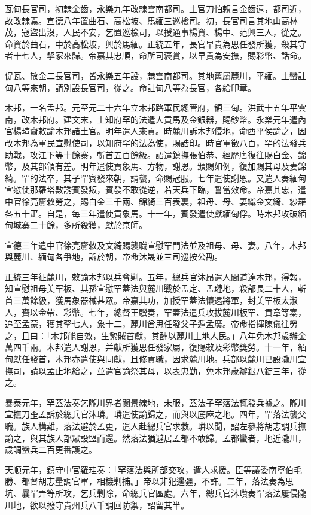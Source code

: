 \begin{pinyinscope}
瓦甸長官司，初隸金齒，永樂九年改隸雲南都司。土官刀怕賴言金齒遠，都司近，故改隸焉。宣德八年置曲石、高松坡、馬緬三巡檢司。初，長官司言其地山高林茂，寇盜出沒，人民不安，乞置巡檢司，以授通事楊資、楊中、范興三人，從之。命資於曲石，中於高松坡，興於馬緬。正統五年，長官早貴為思任發所獲，殺其守者十七人，挈家來歸。帝嘉其忠順，命所司褒賞，以早貴為安撫，賜彩幣、誥命。

促瓦、散金二長官司，皆永樂五年設，隸雲南都司。其地舊屬麓川，平緬。土蠻註甸八等來朝，請別設長官司，從之。命註甸八等為長官，各給印章。

木邦，一名孟邦。元至元二十六年立木邦路軍民總管府，領三甸。洪武十五年平雲南，改木邦府。建文末，土知府罕的法遣人貢馬及金銀器，賜鈔幣。永樂元年遣內官楊瑄齎敕諭木邦諸土官。明年遣人來貢。時麓川訴木邦侵地，命西平侯諭之，因改木邦為軍民宣慰使司，以知府罕的法為使，賜誥印。時官軍徵八百，罕的法發兵助戰，攻江下等十餘寨，斬首五百餘級。詔遣鎮撫張伯恭、經歷唐復往賜白金、錦幣，及其部領有差。明年遣使貢象馬、方物，謝恩。頒賜如例，復加賜其母及妻錦綺。罕的法卒，其子罕賓發來朝，請襲，命賜冠服。七年遣使謝恩。又遣人奏緬甸宣慰使那羅塔數誘賓發叛，賓發不敢從逆，若天兵下臨，誓當效命。帝嘉其忠，遣中官徐亮齎敕勞之，賜白金三千兩、錦綺三百表裏，祖母、母、妻織金文綺、紗羅各五十疋。自是，每三年遣使貢象馬。十一年，賓發遣使獻緬甸俘。時木邦攻破緬甸城寨二十餘，多所殺獲，獻於京師。

宣德三年遣中官徐亮齎敕及文綺賜襲職宣慰罕門法並及祖母、母、妻。八年，木邦與麓川、緬甸各爭地，訴於朝，帝命沐晟並三司巡按公勘。

正統三年征麓川，敕諭木邦以兵會剿。五年，總兵官沐昂遣人間道達木邦，得報，知宣慰祖母美罕板、其孫宣慰罕蓋法與麓川戰於孟定、孟璉地，殺部長二十人，斬首三萬餘級，獲馬象器械甚眾。帝嘉其功，加授罕蓋法懷遠將軍，封美罕板太淑人，賚以金帶、彩幣。七年，總督王驥奏，罕蓋法遣兵攻拔麓川板罕、貢章等寨，追至孟蒙，獲其孥七人，象十二，麓川酋思任發父子遁孟廣。帝命指揮陳儀往勞之，且曰：「木邦能自效，生縶賊首獻，其酬以麓川土地人民。」八年免木邦歲辦金萬四千兩。木邦遣人謝恩，并獻所獲思任發家屬，復賜敕及彩幣獎勞。十一年，緬甸獻任發首，木邦亦遣使與同獻，且修貢職，因求麓川地。兵部以麓川已設隴川宣撫司，請以孟止地給之，並遣官諭祭其母，以表忠勤，免木邦歲辦銀八錠三年，從之。

暴泰元年，罕蓋法奏乞隴川界者闌景線地，未服，蓋法子罕落法輒發兵據之。隴川宣撫刀歪孟訴於總兵官沐璘。璘遣使諭歸之，而與以底麻之地。四年，罕落法襲父職。族人構難，落法避於孟更，遣人赴總兵官求救。璘以聞，詔左參將胡志調兵撫諭之，與其族人部眾設盟而還。然落法猶避居孟都不敢歸。孟都蠻者，地近隴川，歲調蠻兵二百更番護之。

天順元年，鎮守中官羅珪奏：「罕落法與所部交攻，遣人求援。臣等議委南寧伯毛勝、都督胡志量調官軍，相機剿捕。」帝以非犯邊疆，不許。二年，落法奏為思坑、曩罕弄等所攻，乞兵剿除，命總兵官區處。六年，總兵官沐瓚奏罕落法屢侵隴川地，欲以撥守貴州兵八千調回防禦，詔留其半。


\end{pinyinscope}
